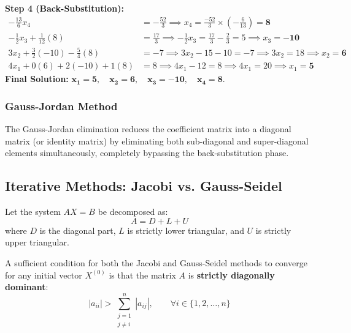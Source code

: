 \documentclass[11pt,a4paper]{article}
\begin{document}
\begin{solbox}
\textbf{Step 4 (Back-Substitution):}
\begin{align*}
    -\frac{13}{6} x_4 &= -\frac{52}{3} \implies x_4 = \frac{-52}{3} \times \left(-\frac{6}{13}\right) = \mathbf{8} \\
    -\frac{1}{2} x_3 + \frac{1}{12}(8) &= \frac{17}{3} \implies -\frac{1}{2} x_3 = \frac{17}{3} - \frac{2}{3} = 5 \implies x_3 = \mathbf{-10} \\
    3 x_2 + \frac{3}{2}(-10) - \frac{5}{4}(8) &= -7 \implies 3 x_2 - 15 - 10 = -7 \implies 3 x_2 = 18 \implies x_2 = \mathbf{6} \\
    4 x_1 + 0(6) + 2(-10) + 1(8) &= 8 \implies 4 x_1 - 12 = 8 \implies 4 x_1 = 20 \implies x_1 = \mathbf{5}
\end{align*}
\textbf{Final Solution:} $\mathbf{x_1 = 5, \quad x_2 = 6, \quad x_3 = -10, \quad x_4 = 8}$.
\end{solbox}

\subsubsection{Gauss-Jordan Method}
The Gauss-Jordan elimination reduces the coefficient matrix into a diagonal matrix (or identity matrix) by eliminating both sub-diagonal and super-diagonal elements simultaneously, completely bypassing the back-substitution phase.

\subsection{Iterative Methods: Jacobi vs. Gauss-Seidel}
Let the system $AX = B$ be decomposed as:
\begin{equation}
    A = D + L + U
\end{equation}
where $D$ is the diagonal part, $L$ is strictly lower triangular, and $U$ is strictly upper triangular.

\begin{theorembox}
A sufficient condition for both the Jacobi and Gauss-Seidel methods to converge for any initial vector $X^{(0)}$ is that the matrix $A$ is \textbf{strictly diagonally dominant}:
\begin{equation}
    |a_{ii}| > \sum_{\substack{j=1 \\ j \ne i}}^n |a_{ij}|, \qquad \forall i \in \{1, 2, \dots, n\}
\end{equation}
\end{theorembox}
\end{document}
